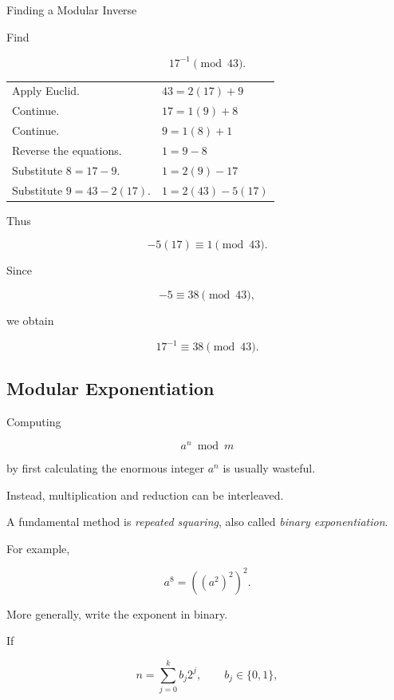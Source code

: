 \begin{workedexamplebox}{Finding a Modular Inverse}

Find

\[ 17^{-1}\pmod{43}. \]

\begin{tabularx}{\textwidth}{@{}>{\raggedright\arraybackslash}p{}X@{}}
Apply Euclid. & \(43=2(17)+9\)\\
Continue. & \(17=1(9)+8\)\\
Continue. & \(9=1(8)+1\)\\
Reverse the equations. & \(1=9-8\)\\
Substitute \(8=17-9\). & \(1=2(9)-17\)\\
Substitute \(9=43-2(17)\). & \(1=2(43)-5(17)\)
\end{tabularx}

Thus

\[ -5(17)\equiv1\pmod{43}. \]

Since

\[ -5\equiv38\pmod{43}, \]

we obtain

\begin{answerbox}
\[ \boxed{17^{-1}\equiv38\pmod{43}.} \]
\end{answerbox}
\end{workedexamplebox}

\subsection{Modular Exponentiation}
\label{subsec:modular-exponentiation}

Computing

\[ a^n\bmod m \]

by first calculating the enormous integer \(a^n\) is usually wasteful.

Instead, multiplication and reduction can be interleaved.

A fundamental method is \emph{repeated squaring}, also called
\emph{binary exponentiation}.

For example,

\[ a^8=((a^2)^2)^2. \]

More generally, write the exponent in binary.

If

\[ n=\sum_{j=0}^{k}b_j2^j,\qquad b_j\in\{0,1\}, \]

